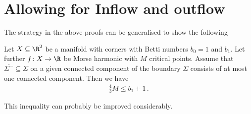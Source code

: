 
\section{Allowing for Inflow and outflow}

The strategy in the above proofs can be generalised to show the following
\begin{conjecture}
  Let $X\subseteq\R^2$ be a manifold with corners with Betti numbers $b_0=1$ and $b_1$.
  Let further $f\colon X\to\R$ be Morse harmonic with $M$ critical points.
  Assume that 
  $\overline{\Sigma^-}\subseteq\Sigma$ on a given connected component 
  of the boundary $\Sigma$
  consists of at most one connected component. Then we have
  \begin{align*}
    \frac{4}{3}M\leq b_1+1\,.
  \end{align*}
\end{conjecture}
This inequality can probably be improved considerably.

